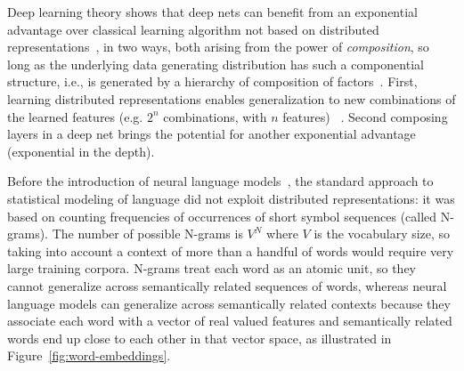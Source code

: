\documentclass[10pts]{article}
\begin{document}
Deep learning theory shows that deep nets can benefit from
an exponential advantage over classical learning algorithm not based on distributed 
representations~\citep{Bengio-localfailure-NIPS-2006-small},
 in two ways, both arising from the power of {\em composition}, so long as the
underlying data generating distribution has such a componential structure, i.e.,
is generated by a hierarchy of composition of factors~\citep{Bengio-Courville-Vincent-TPAMI2013}.
First, learning distributed representations enables generalization to new
combinations of the learned features (e.g. $2^n$ combinations, with $n$ features)
~\citep{Bengio-2009-book,Montufar+Morton-2014}. 
Second composing layers in a deep net brings the potential for another exponential
advantage~\citep{Montufar-et-al-NIPS2014} (exponential in the depth).


Before the introduction of neural language
models~\citep{BenDucVin01-short}, the standard approach to statistical
modeling of language did not exploit distributed representations: it 
was based on counting frequencies of occurrences of
short symbol sequences (called N-grams). 
The number of possible N-grams is $V^N$ where $V$ is
the vocabulary size, so taking
into account a context of more than a handful of words would require
very large training corpora. 
N-grams treat each word as an atomic unit, so they cannot generalize across
semantically related sequences of words, whereas
neural language models can generalize across semantically related
contexts because they associate each word with a vector of real
valued features
and semantically related
words end up close to each other in that vector space, as illustrated in
Figure~\ref{fig:word-embeddings}. 
\end{document}
